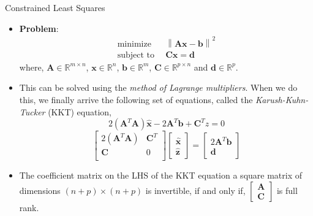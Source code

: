 \documentclass[aspectratio=169]{beamer}
\begin{document}
\begin{frame}[t]{Constrained Least Squares}
\begin{small}
\begin{itemize}
    \item \textbf{Problem}:
    \vspace{-0.5cm}
    \[
    \begin{split}
    \text{minimize} & \,\,\, \left\lVert \mathbf{Ax} - \mathbf{b}\right\rVert^2\\
    \text{subject to} & \,\,\, \mathbf{Cx} = \mathbf{d}
    \end{split} 
    \]
    where, $\mathbf{A} \in \mathbb{R}^{m \times n}$, $\mathbf{x} \in \mathbb{R}^n$, $\mathbf{b} \in \mathbb{R}^m$, $\mathbf{C} \in \mathbb{R}^{p \times n}$ and $\mathbf{d} \in \mathbb{R}^p$.

    \item This can be solved using the \textit{method of Lagrange multipliers}. When we do this, we finally arrive the following set of equations, called the \textit{Karush-Kuhn-Tucker} (KKT) equation,
    \[  2\left(\mathbf{A}^T\mathbf{A}\right)\hat{\mathbf{x}} - 2\mathbf{A}^T\mathbf{b} + \mathbf{C}^T\hat{z} = 0  \]
    \[  \begin{bmatrix*}
    2\left(\mathbf{A}^T\mathbf{A}\right) & \mathbf{C}^T\\
    \mathbf{C} & 0\\ 
    \end{bmatrix*}\begin{bmatrix*} \hat{\mathbf{x}}\\ \hat{\mathbf{z}}\end{bmatrix*} = \begin{bmatrix*} 2\mathbf{A}^T\mathbf{b} \\ \mathbf{d}\end{bmatrix*} \]
    \item The coefficient matrix on the LHS of the KKT equation a square matrix of dimensions $\left(n+p\right) \times \left(n+p\right)$ is invertible, if and only if, $\begin{bmatrix}\mathbf{A}\\\mathbf{C}\end{bmatrix}$ is full rank.
\end{itemize}
\end{small}
\end{frame}
\end{document}
